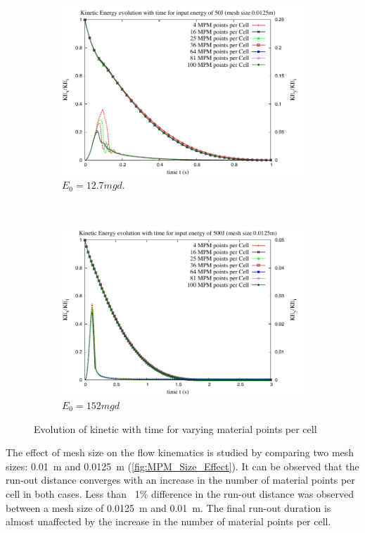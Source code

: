 \begin{figure}[tbhp]
\centering
\begin{subfigure}[b]{0.95\textwidth}
\includegraphics[width=\textwidth]{KE_50}
\caption{$E_0=12.7mgd$.}
\label{fig:KE_50}
\end{subfigure}
\\
\begin{subfigure}[b]{0.95\textwidth}
\centering
\includegraphics[width=\textwidth]{KE_500}
\caption{$E_0=152mgd$}
\label{fig:KE_500}
\end{subfigure}
\caption{Evolution of kinetic with time for varying material points per cell}
\label{fig:KE_MPM}
\end{figure}

The effect of mesh size on the flow kinematics is studied by comparing two mesh 
sizes: 0.01~\si{\m} and 0.0125~\si{\m} (\cref{fig:MPM_Size_Effect}). It can 
be observed that the run-out distance converges with an increase in the number 
of material points per cell in both cases. Less than ~1\% difference in the 
run-out distance was observed between a mesh size of 0.0125~\si{\m} and 
0.01~\si{\m}. The final run-out duration is almost unaffected by the increase 
in the number of material points per cell. 
 

